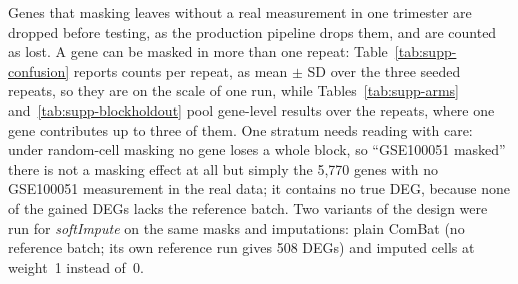 \documentclass[11pt,a4paper]{article}
\begin{document}
\noindent
Genes that masking leaves
without a real measurement in one trimester are dropped before
testing, as the production pipeline drops them, and are counted
as lost. A gene can be masked in more than one repeat:
Table~\ref{tab:supp-confusion} reports counts per repeat, as
mean $\pm$ SD over the three seeded repeats, so they are on
the scale of one run, while Tables~\ref{tab:supp-arms}
and~\ref{tab:supp-blockholdout} pool gene-level results over
the repeats, where one gene contributes up to three of them. One stratum needs
reading with care: under random-cell masking no gene loses a
whole block, so ``GSE100051 masked'' there is not a masking
effect at all but simply the 5{,}770 genes with no GSE100051
measurement in the real data; it contains no true DEG, because
none of the gained DEGs lacks the reference batch.
Two variants of the design were run for \textit{softImpute} on
the same masks and imputations: plain ComBat (no reference
batch; its own reference run gives 508 DEGs) and imputed cells at
weight~1 instead of~0.
\end{document}

